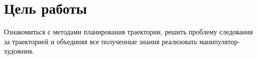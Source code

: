 \section{Цель работы\\}
Ознакомиться с методами планирования траектории, решить проблему следования за траекторией и объединяя все полученные знания реализовать манипулятор-художник.